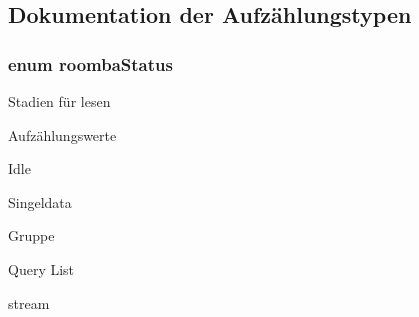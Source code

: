 \subsection{Dokumentation der Aufzählungstypen}
\hypertarget{group__reader_ga74bd1c0af119d3680033932aee94d998}{
\subsubsection[{roomba\-Status}]{\setlength{\rightskip}{0pt plus 5cm}enum {\bf roomba\-Status}}}\label{group__reader_ga74bd1c0af119d3680033932aee94d998}
Stadien für lesen \begin{Desc}
\item[Aufzählungswerte]\par
\begin{description}
\item[{\em 
\hypertarget{group__reader_gga74bd1c0af119d3680033932aee94d998a0e9a37114c0e458d28d52f06ec0f2242}{idle}\label{group__reader_gga74bd1c0af119d3680033932aee94d998a0e9a37114c0e458d28d52f06ec0f2242}
}]Idle \item[{\em 
\hypertarget{group__reader_gga74bd1c0af119d3680033932aee94d998a0f5565850b8d65e6ecd05739440bb48a}{singeldata}\label{group__reader_gga74bd1c0af119d3680033932aee94d998a0f5565850b8d65e6ecd05739440bb48a}
}]Singeldata \item[{\em 
\hypertarget{group__reader_gga74bd1c0af119d3680033932aee94d998a084e12cf09138eec8d807c9ca90d1021}{group}\label{group__reader_gga74bd1c0af119d3680033932aee94d998a084e12cf09138eec8d807c9ca90d1021}
}]Gruppe \item[{\em 
\hypertarget{group__reader_gga74bd1c0af119d3680033932aee94d998a87aed4f2a754303740474022109f678a}{query}\label{group__reader_gga74bd1c0af119d3680033932aee94d998a87aed4f2a754303740474022109f678a}
}]Query List \item[{\em 
\hypertarget{group__reader_gga74bd1c0af119d3680033932aee94d998a8c135cc3d1b918bd7b75a65104cac458}{stream}\label{group__reader_gga74bd1c0af119d3680033932aee94d998a8c135cc3d1b918bd7b75a65104cac458}
}]stream \end{description}
\end{Desc}


